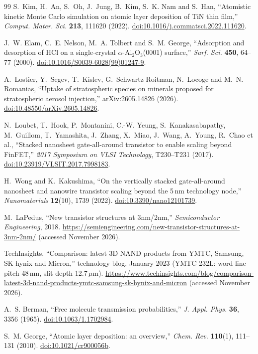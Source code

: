 \documentclass[11pt,letterpaper]{article}
\begin{document}
\begin{thebibliography}{99}
S.~Kim, H.~An, S.~Oh, J.~Jung, B.~Kim, S.~K. Nam and S.~Han,
``Atomistic kinetic Monte Carlo simulation on atomic layer deposition of TiN thin film,''
\emph{Comput. Mater. Sci.} \textbf{213}, 111620 (2022).
\href{https://doi.org/10.1016/j.commatsci.2022.111620}{doi:10.1016/j.commatsci.2022.111620}.

J.~W. Elam, C.~E. Nelson, M.~A. Tolbert and S.~M. George,
``Adsorption and desorption of HCl on a single-crystal $\alpha$-Al$_2$O$_3$(0001) surface,''
\emph{Surf. Sci.} \textbf{450}, 64--77 (2000).
\href{https://doi.org/10.1016/S0039-6028(99)01247-9}{doi:10.1016/S0039-6028(99)01247-9}.

A.~Lostier, Y.~Segev, T.~Kislev, G.~Schwartz Roitman, N.~Locoge and M.~N. Romanias,
``Uptake of stratospheric species on minerals proposed for stratospheric aerosol injection,''
arXiv:2605.14826 (2026).
\href{https://doi.org/10.48550/arXiv.2605.14826}{doi:10.48550/arXiv.2605.14826}.

N.~Loubet, T.~Hook, P.~Montanini, C.-W. Yeung, S.~Kanakasabapathy, M.~Guillom, T.~Yamashita, J.~Zhang, X.~Miao, J.~Wang, A.~Young, R.~Chao et al.,
``Stacked nanosheet gate-all-around transistor to enable scaling beyond FinFET,''
\emph{2017 Symposium on VLSI Technology}, T230--T231 (2017).
\href{https://doi.org/10.23919/VLSIT.2017.7998183}{doi:10.23919/VLSIT.2017.7998183}.

H.~Wong and K.~Kakushima,
``On the vertically stacked gate-all-around nanosheet and nanowire transistor scaling beyond the 5\,nm technology node,''
\emph{Nanomaterials} \textbf{12}(10), 1739 (2022).
\href{https://doi.org/10.3390/nano12101739}{doi:10.3390/nano12101739}.

M.~LaPedus, ``New transistor structures at 3nm/2nm,'' \emph{Semiconductor Engineering}, 2018.
\url{https://semiengineering.com/new-transistor-structures-at-3nm-2nm/} (accessed November 2026).

TechInsights, ``Comparison: latest 3D NAND products from YMTC, Samsung, SK hynix and Micron,'' technology blog, January 2023 (YMTC 232L: word-line pitch 48\,nm, slit depth 12.7\,$\mu$m).
\url{https://www.techinsights.com/blog/comparison-latest-3d-nand-products-ymtc-samsung-sk-hynix-and-micron} (accessed November 2026).

A.~S. Berman,
``Free molecule transmission probabilities,''
\emph{J. Appl. Phys.} \textbf{36}, 3356 (1965).
\href{https://doi.org/10.1063/1.1702984}{doi:10.1063/1.1702984}.

S.~M. George,
``Atomic layer deposition: an overview,''
\emph{Chem. Rev.} \textbf{110}(1), 111--131 (2010).
\href{https://doi.org/10.1021/cr900056b}{doi:10.1021/cr900056b}.

\end{thebibliography}
\endgroup
\end{document}
